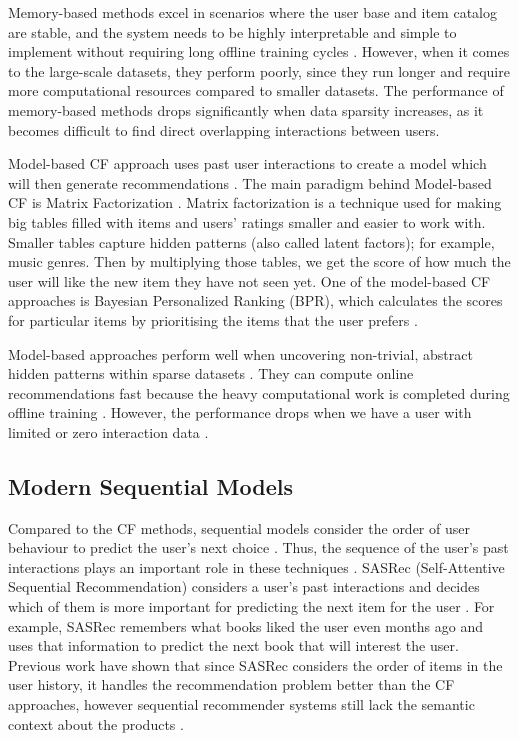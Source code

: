 \documentclass[conference]{IEEEtran}
\begin{document}
Memory-based methods excel in scenarios where the user base and item catalog are stable, and the system needs to be highly interpretable and simple to implement without requiring long offline training cycles \cite{b16}. However, when it comes to the large-scale datasets, they perform poorly, since they run longer and require more computational resources compared to smaller datasets.  The performance of memory-based methods drops significantly when data sparsity increases,  as it becomes difficult to find direct overlapping interactions between users\cite{b19}.

Model-based CF approach uses past user interactions to create a model which will then generate recommendations \cite{b1}. The main paradigm behind Model-based CF is Matrix Factorization \cite{b17}. Matrix factorization is a technique used for making big tables filled with items and users’ ratings smaller and easier to work with. Smaller tables capture hidden patterns (also called latent factors); for example, music genres. Then by multiplying those tables, we get the score of how much the user will like the new item they have not seen yet. One of the model-based CF approaches is Bayesian Personalized Ranking (BPR), which calculates the scores for particular items by prioritising the items that the user prefers \cite{b1}.

Model-based approaches perform well when uncovering non-trivial, abstract hidden patterns within sparse datasets \cite{b1,b11}. They can compute online recommendations fast because the heavy computational work is completed during offline training \cite{b17}. However, the performance drops when we have a user with limited or zero interaction data \cite{b2,b4,b11}.


\subsection{Modern Sequential Models}
Compared to the CF methods, sequential models consider the order of user behaviour to predict the user's next choice \cite{b2,b17, b19}. Thus, the sequence of the user’s past interactions plays an important role in these techniques \cite{b14}. SASRec (Self-Attentive Sequential Recommendation) considers a user's past interactions and decides which of them is more important for predicting the next item for the user \cite{b1,b14}. For example, SASRec remembers what books liked the user even months ago and uses that information to predict the next book that will interest the user. Previous work have shown that since SASRec considers the order of items in the user history, it handles the recommendation problem better than the CF approaches, however sequential recommender systems still lack the semantic context about the products \cite{b2,b4, b6, b11, b15}. 
\end{document}
